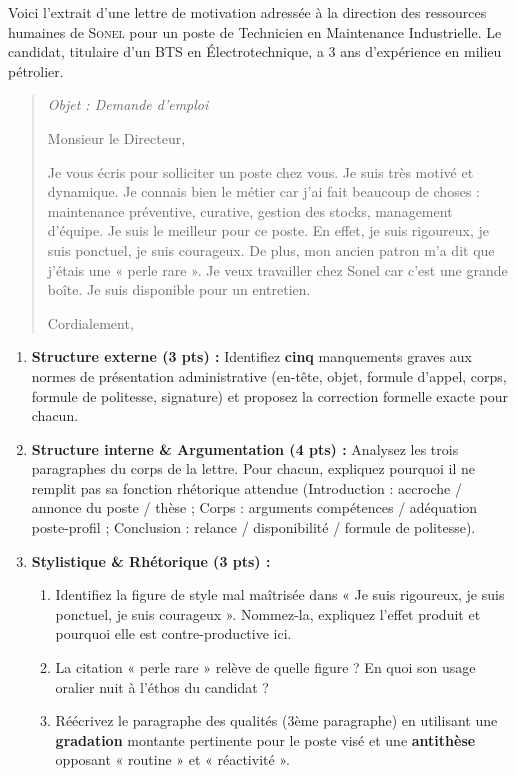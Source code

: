 \documentclass[11pt]{article}
\begin{document}
\begin{exercice}
Voici l'extrait d'une lettre de motivation adressée à la direction des ressources humaines de \textsc{Sonel} pour un poste de Technicien en Maintenance Industrielle. Le candidat, titulaire d'un BTS en Électrotechnique, a 3 ans d'expérience en milieu pétrolier.

\begin{quote}
\itshape
Objet : Demande d'emploi

Monsieur le Directeur,

Je vous écris pour solliciter un poste chez vous. Je suis très motivé et dynamique. Je connais bien le métier car j'ai fait beaucoup de choses : maintenance préventive, curative, gestion des stocks, management d'équipe. Je suis le meilleur pour ce poste. En effet, je suis rigoureux, je suis ponctuel, je suis courageux. De plus, mon ancien patron m'a dit que j'étais une « perle rare ». Je veux travailler chez Sonel car c'est une grande boîte. Je suis disponible pour un entretien.

Cordialement,
\end{quote}

\begin{enumerate}
    \item \textbf{Structure externe (3 pts) :} Identifiez \textbf{cinq} manquements graves aux normes de présentation administrative (en-tête, objet, formule d'appel, corps, formule de politesse, signature) et proposez la correction formelle exacte pour chacun.
    \item \textbf{Structure interne \& Argumentation (4 pts) :} Analysez les trois paragraphes du corps de la lettre. Pour chacun, expliquez pourquoi il ne remplit pas sa fonction rhétorique attendue (Introduction : accroche / annonce du poste / thèse ; Corps : arguments compétences / adéquation poste-profil ; Conclusion : relance / disponibilité / formule de politesse).
    \item \textbf{Stylistique \& Rhétorique (3 pts) :} 
    \begin{enumerate}
        \item Identifiez la figure de style mal maîtrisée dans « Je suis rigoureux, je suis ponctuel, je suis courageux ». Nommez-la, expliquez l'effet produit et pourquoi elle est contre-productive ici.
        \item La citation « perle rare » relève de quelle figure ? En quoi son usage oralier nuit à l'éthos du candidat ?
        \item Réécrivez le paragraphe des qualités (3ème paragraphe) en utilisant une \textbf{gradation} montante pertinente pour le poste visé et une \textbf{antithèse} opposant « routine » et « réactivité ».
    \end{enumerate}
\end{enumerate}
\end{exercice}
\end{document}
